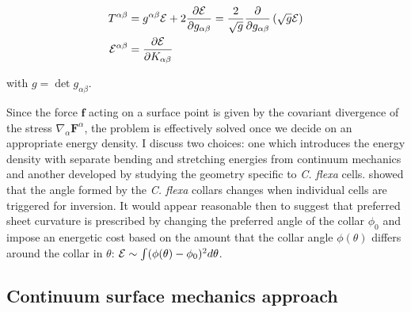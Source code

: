 \begin{align*}
    T^{\alpha\beta} &= g^{\alpha\beta} \mathcal{E} + 2 \frac{\partial \mathcal{E}}{\partial g_{\alpha\beta}} = \frac{2}{\sqrt{g}} \frac{\partial}{\partial g_{\alpha\beta}} \left(\sqrt{g}\mathcal{E} \right) \\
    \mathcal{E}^{\alpha\beta} &= \frac{\partial \mathcal{E}}{\partial K_{\alpha\beta}}
\end{align*}

\noindent with $g = \det{g_{\alpha\beta}}$.

Since the force $\bm{f}$ acting on a surface point is given by the covariant divergence of the stress $\nabla_\alpha \bm{F}^\alpha$, the problem is effectively solved once we decide on an appropriate energy density. 
I discuss two choices: one which introduces the energy density with separate bending and stretching energies from continuum mechanics and another developed by studying the geometry specific to \textit{C. flexa} cells.
\citet{brunet2019} showed that the angle formed by the \textit{C. flexa} collars changes when individual cells are triggered for inversion. 
It would appear reasonable then to suggest that preferred sheet curvature is prescribed by changing the preferred angle of the collar $\phi_0$ and impose an energetic cost based on the amount that the collar angle $\phi(\theta)$ differs around the collar in $\theta$: $\mathcal{E} \sim \int (\phi(\theta) - \phi_0)^2 d\theta$.

\subsection{Continuum surface mechanics approach} \label{subsec:cts}

